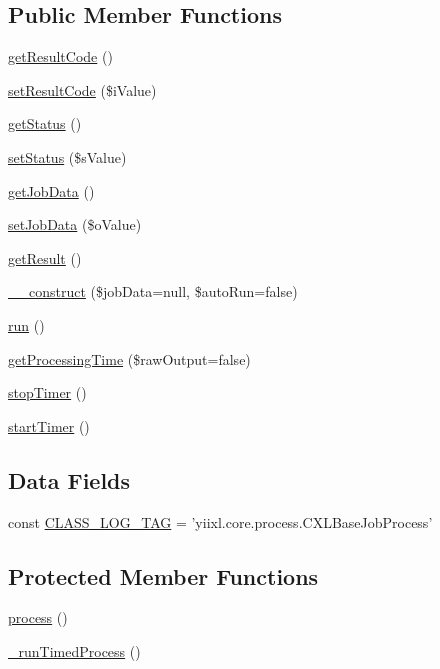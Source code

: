 \subsection*{Public Member Functions}
\begin{DoxyCompactItemize}
\item 
\hyperlink{classCXLBaseJobProcess_a43878aef3c85b396a28e4b8e4fce0fc2}{getResultCode} ()
\item 
\hyperlink{classCXLBaseJobProcess_af1f91fdb702f9b13e5869aed94fa61ae}{setResultCode} (\$iValue)
\item 
\hyperlink{classCXLBaseJobProcess_a9d21636071f529e2154051d3ea6e5921}{getStatus} ()
\item 
\hyperlink{classCXLBaseJobProcess_aa6fdfc32edc157649619c5c549f7d651}{setStatus} (\$sValue)
\item 
\hyperlink{classCXLBaseJobProcess_a8ec5d045b7c39a3712a14426a5fb9219}{getJobData} ()
\item 
\hyperlink{classCXLBaseJobProcess_abafd9c8b01d9f53afd70c9746e2d8797}{setJobData} (\$oValue)
\item 
\hyperlink{classCXLBaseJobProcess_ae077eb8a032a325ceb939bfabfa5f472}{getResult} ()
\item 
\hyperlink{classCXLBaseJobProcess_ac958924ca9aaf706efd2e636b829237d}{\_\-\_\-construct} (\$jobData=null, \$autoRun=false)
\item 
\hyperlink{classCXLBaseJobProcess_afb0fafe7e02a3ae1993c01c19fad2bae}{run} ()
\item 
\hyperlink{classCXLBaseJobProcess_ab4f56c77fcc5ccf476933c368aeae513}{getProcessingTime} (\$rawOutput=false)
\item 
\hyperlink{classCXLBaseJobProcess_a013c0d9ca789c13c56b13cb96d26174a}{stopTimer} ()
\item 
\hyperlink{classCXLBaseJobProcess_a3f20c6773be010b2744fb3451651746c}{startTimer} ()
\end{DoxyCompactItemize}
\subsection*{Data Fields}
\begin{DoxyCompactItemize}
\item 
const \hyperlink{classCXLBaseJobProcess_aa607ab5e557e6ebb60b85c5a20ad067f}{CLASS\_\-LOG\_\-TAG} = 'yiixl.core.process.CXLBaseJobProcess'
\end{DoxyCompactItemize}
\subsection*{Protected Member Functions}
\begin{DoxyCompactItemize}
\item 
\hyperlink{classCXLBaseJobProcess_a7d4ad4038b036a67eece619e6f88c89e}{process} ()
\item 
\hyperlink{classCXLBaseJobProcess_affa56f73ffc8554251c1cda1e6a8fbf1}{\_\-runTimedProcess} ()
\end{DoxyCompactItemize}
